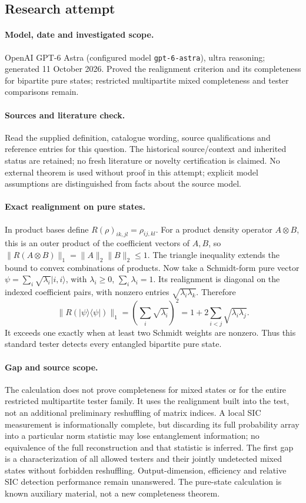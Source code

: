 \documentclass[11pt]{article}
\begin{document}
\subsection{Research attempt}
\paragraph{Model, date and investigated scope.}
OpenAI GPT-6 Astra (configured model \texttt{gpt-6-astra}), ultra reasoning; generated 11 October 2026. Proved the realignment criterion and its completeness for bipartite pure states; restricted multipartite mixed completeness and tester comparisons remain.

\paragraph{Sources and literature check.}
Read the supplied definition, catalogue wording, source qualifications and reference entries for this question. The historical source/context and inherited status are retained; no fresh literature or novelty certification is claimed. No external theorem is used without proof in this attempt; explicit model assumptions are distinguished from facts about the source model.

\paragraph{Exact realignment on pure states.} In product bases define \(R(\rho)_{ik,jl}=\rho_{ij,kl}\). For a product density operator \(A\otimes B\), this is an outer product of the coefficient vectors of \(A,B\), so \(\|R(A\otimes B)\|_1=\|A\|_2\|B\|_2\le1\). The triangle inequality extends the bound to convex combinations of products. Now take a Schmidt-form pure vector \(\psi=\sum_i\sqrt{\lambda_i}|i,i\rangle\), with \(\lambda_i\ge0\), \(\sum_i\lambda_i=1\). Its realignment is diagonal on the indexed coefficient pairs, with nonzero entries \(\sqrt{\lambda_i\lambda_k}\). Therefore
\[
 \|R(|\psi\rangle\langle\psi|)\|_1
 =\left(\sum_i\sqrt{\lambda_i}\right)^2
 =1+2\sum_{i<j}\sqrt{\lambda_i\lambda_j}.
\]
It exceeds one exactly when at least two Schmidt weights are nonzero. Thus this standard tester detects every entangled bipartite pure state.
\paragraph{Gap and source scope.} The calculation does not prove completeness for mixed states or for the entire restricted multipartite tester family. It uses the realignment built into the test, not an additional preliminary reshuffling of matrix indices. A local SIC measurement is informationally complete, but discarding its full probability array into a particular norm statistic may lose entanglement information; no equivalence of the full reconstruction and that statistic is inferred. The first gap is a characterization of all allowed testers and their jointly undetected mixed states without forbidden reshuffling. Output-dimension, efficiency and relative SIC detection performance remain unanswered. The pure-state calculation is known auxiliary material, not a new completeness theorem.
\end{document}

